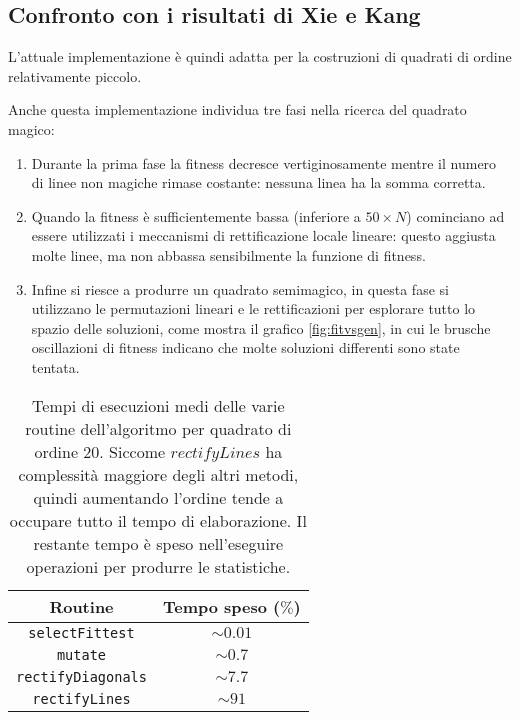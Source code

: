 \documentclass[italian,twoside,twocolumn]{article}
\begin{document}
\subsection{Confronto con i risultati di Xie e Kang}

L'attuale implementazione è quindi adatta per la costruzioni di quadrati di ordine relativamente piccolo.

Anche questa implementazione individua tre fasi nella ricerca del quadrato magico:
\begin{enumerate}
	\item Durante la prima fase la fitness decresce vertiginosamente mentre il numero di linee non magiche rimase costante: nessuna linea ha la somma corretta.
	\item Quando la fitness è sufficientemente bassa (inferiore a $ 50 \times N $) cominciano ad essere utilizzati i meccanismi di rettificazione locale lineare: questo aggiusta molte linee, ma non abbassa sensibilmente la funzione di fitness.
	\item Infine si riesce a produrre un quadrato semimagico, in questa fase si utilizzano le permutazioni lineari e le rettificazioni per esplorare tutto lo spazio delle soluzioni, come mostra il grafico \ref{fig:fitvsgen}, in cui le brusche oscillazioni di fitness indicano che molte soluzioni differenti sono state tentata. 
\end{enumerate}

\begin{table}[htbp]
	\centering
	\caption{Tempi di esecuzioni medi delle varie routine dell'algoritmo per quadrato di ordine 20. Siccome $ rectifyLines $ ha complessità maggiore degli altri metodi, quindi aumentando l'ordine tende a occupare tutto il tempo di elaborazione. Il restante tempo è speso nell'eseguire operazioni per produrre le statistiche.}
\begin{tabular}{cc}
	\hline
	         Routine          & Tempo speso ($ \si{\percent} $) \\ \hline
	 \texttt{selectFittest}   &          $ \sim 0.01 $           \\
	     \texttt{mutate}      &           $ \sim 0.7 $            \\
	\texttt{rectifyDiagonals} &           $ \sim 7.7 $           \\
	  \texttt{rectifyLines}   &           $ \sim 91 $           \\ \hline
\end{tabular} 
	\label{tab:tempi_gentic}
\end{table}
\end{document}
